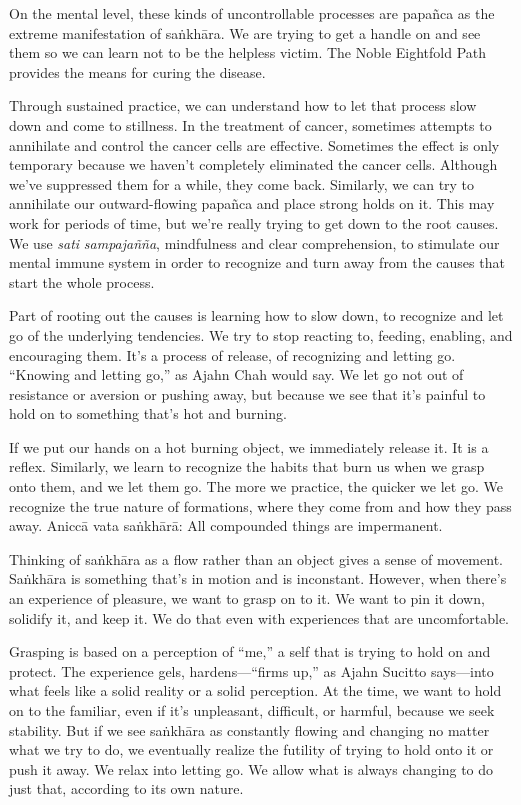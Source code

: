 On the mental level, these kinds of uncontrollable processes are papañca as the extreme manifestation of saṅkhāra. \linebreak We are trying to get a handle on and see them so we can learn not to be the helpless victim. The Noble Eightfold Path provides the means for curing the disease.

Through sustained practice, we can understand how to let that process slow down and come to stillness. In the treatment of cancer, sometimes attempts to annihilate and control the cancer cells are effective. Sometimes the effect is only temporary because we haven't completely eliminated the cancer cells. Although we've suppressed them for a while, they come back. Similarly, we can try to annihilate our outward-flowing papañca and place strong holds on it. This may work for periods of time, but we're really trying to get down to the root causes. We use \emph{sati} \emph{sampajañña}, mindfulness and clear comprehension, to stimulate our mental immune system in order to recognize and turn away from the causes that start the whole process.

Part of rooting out the causes is learning how to slow down, to recognize and let go of the underlying tendencies. We try to stop reacting to, feeding, enabling, and encouraging them. It's a process of release, of recognizing and letting go. ``Knowing and letting go,'' as Ajahn Chah would say. We let go not out of resistance or aversion or pushing away, but because we see that it's painful to hold on to something that's hot and burning.

If we put our hands on a hot burning object, we immediately release it. It is a reflex. Similarly, we learn to recognize the habits that burn us when we grasp onto them, and we let them go. The more we practice, the quicker we let go. We recognize the true nature of formations, where they come from and how they pass away. Aniccā vata saṅkhārā: All compounded things are impermanent.

Thinking of saṅkhāra as a flow rather than an object gives a sense of movement. Saṅkhāra is something that's in motion and is inconstant. However, when there's an experience of pleasure, we want to grasp on to it. We want to pin it down, solidify it, and keep it. We do that even with experiences that are uncomfortable.

Grasping is based on a perception of ``me,'' a self that is trying to hold on and protect. The experience gels, hardens---``firms up,'' as Ajahn Sucitto says---into what feels like a solid reality or a solid perception. At the time, we want to hold on to the familiar, even if it's unpleasant, difficult, or harmful, because we seek stability. But if we see saṅkhāra as constantly flowing and changing no matter what we try to do, we eventually realize the futility of trying to hold onto it or push it away. We relax into letting go. We allow what is always changing to do just that, according to its own nature.

